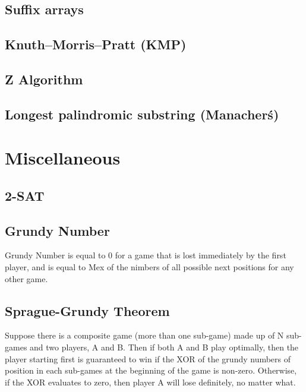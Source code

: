 \documentclass[12pt]{extarticle}
\begin{document}
\begin{multicols*}{2}
\subsection{Suffix arrays} %


\subsection{Knuth--Morris--Pratt (KMP)} %


\subsection{Z Algorithm} %


\subsection{Longest palindromic substring (Manacher\'s)} %



\section{Miscellaneous}

\subsection{2-SAT} %


\subsection{Grundy Number}
Grundy Number is equal to 0 for a game that is lost immediately by the first player, and is equal to Mex of the nimbers of all possible next positions for any other game.

\subsection{Sprague-Grundy Theorem}
Suppose there is a composite game (more than one sub-game) made up of N sub-games and two players, A and B. Then if both A and B play optimally, then the player starting first is guaranteed to win if the XOR of the grundy numbers of position in each sub-games at the beginning of the game is non-zero. Otherwise, if the XOR evaluates to zero, then player A will lose definitely, no matter what.


\end{multicols*}
\end{document}
